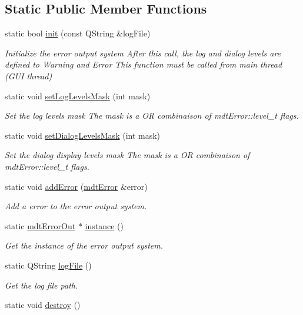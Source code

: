 \subsection*{Static Public Member Functions}
\begin{DoxyCompactItemize}
\item 
\hypertarget{classmdt_error_out_a9c7f05b03d0f09ff02e8f747bdcd1de7}{
static bool \hyperlink{classmdt_error_out_a9c7f05b03d0f09ff02e8f747bdcd1de7}{init} (const QString \&logFile)}
\label{classmdt_error_out_a9c7f05b03d0f09ff02e8f747bdcd1de7}

\begin{DoxyCompactList}\small\item\em Initialize the error output system After this call, the log and dialog levels are defined to Warning and Error This function must be called from main thread (GUI thread) \end{DoxyCompactList}\item 
static void \hyperlink{classmdt_error_out_a547e4e8aa75528710e4a17e9faf48621}{setLogLevelsMask} (int mask)
\begin{DoxyCompactList}\small\item\em Set the log levels mask The mask is a OR combinaison of mdtError::level\_\-t flags. \end{DoxyCompactList}\item 
static void \hyperlink{classmdt_error_out_afa76bdf497b750829277566ec07d44d8}{setDialogLevelsMask} (int mask)
\begin{DoxyCompactList}\small\item\em Set the dialog display levels mask The mask is a OR combinaison of mdtError::level\_\-t flags. \end{DoxyCompactList}\item 
static void \hyperlink{classmdt_error_out_aeb562e93216b34e7b73aa69f42065895}{addError} (\hyperlink{classmdt_error}{mdtError} \&error)
\begin{DoxyCompactList}\small\item\em Add a error to the error output system. \end{DoxyCompactList}\item 
static \hyperlink{classmdt_error_out}{mdtErrorOut} $\ast$ \hyperlink{classmdt_error_out_a7a80480a61ca1a2704ec16d69647f739}{instance} ()
\begin{DoxyCompactList}\small\item\em Get the instance of the error output system. \end{DoxyCompactList}\item 
static QString \hyperlink{classmdt_error_out_a22f721fff4d6368a4a3d51279c6af8fa}{logFile} ()
\begin{DoxyCompactList}\small\item\em Get the log file path. \end{DoxyCompactList}\item 
\hypertarget{classmdt_error_out_a45c1370762b47a06ec597d6e89ebc73d}{
static void \hyperlink{classmdt_error_out_a45c1370762b47a06ec597d6e89ebc73d}{destroy} ()}
\label{classmdt_error_out_a45c1370762b47a06ec597d6e89ebc73d}


\end{DoxyCompactItemize}

